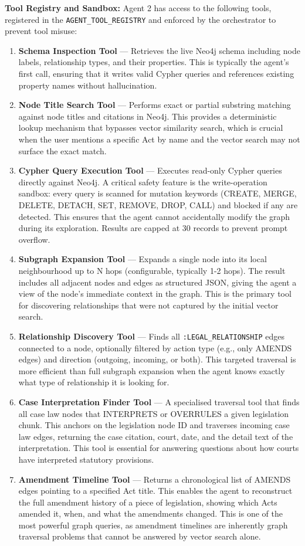 \documentclass[10pt, a4paper, twocolumn]{article}
\begin{document}
\textbf{Tool Registry and Sandbox:} Agent 2 has access to the following tools, registered in the \texttt{AGENT\_TOOL\_REGISTRY} and enforced by the orchestrator to prevent tool misuse:

\begin{enumerate}
    \item \textbf{Schema Inspection Tool} — Retrieves the live Neo4j schema including node labels, relationship types, and their properties. This is typically the agent's first call, ensuring that it writes valid Cypher queries and references existing property names without hallucination.
    \item \textbf{Node Title Search Tool} — Performs exact or partial substring matching against node titles and citations in Neo4j. This provides a deterministic lookup mechanism that bypasses vector similarity search, which is crucial when the user mentions a specific Act by name and the vector search may not surface the exact match.
    \item \textbf{Cypher Query Execution Tool} — Executes read-only Cypher queries directly against Neo4j. A critical safety feature is the write-operation sandbox: every query is scanned for mutation keywords (CREATE, MERGE, DELETE, DETACH, SET, REMOVE, DROP, CALL) and blocked if any are detected. This ensures that the agent cannot accidentally modify the graph during its exploration. Results are capped at 30 records to prevent prompt overflow.
    \item \textbf{Subgraph Expansion Tool} — Expands a single node into its local neighbourhood up to N hops (configurable, typically 1-2 hops). The result includes all adjacent nodes and edges as structured JSON, giving the agent a view of the node's immediate context in the graph. This is the primary tool for discovering relationships that were not captured by the initial vector search.
    \item \textbf{Relationship Discovery Tool} — Finds all \texttt{:LEGAL\_RELATIONSHIP} edges connected to a node, optionally filtered by action type (e.g., only AMENDS edges) and direction (outgoing, incoming, or both). This targeted traversal is more efficient than full subgraph expansion when the agent knows exactly what type of relationship it is looking for.
    \item \textbf{Case Interpretation Finder Tool} — A specialised traversal tool that finds all case law nodes that INTERPRETS or OVERRULES a given legislation chunk. This anchors on the legislation node ID and traverses incoming case law edges, returning the case citation, court, date, and the detail text of the interpretation. This tool is essential for answering questions about how courts have interpreted statutory provisions.
    \item \textbf{Amendment Timeline Tool} — Returns a chronological list of AMENDS edges pointing to a specified Act title. This enables the agent to reconstruct the full amendment history of a piece of legislation, showing which Acts amended it, when, and what the amendments changed. This is one of the most powerful graph queries, as amendment timelines are inherently graph traversal problems that cannot be answered by vector search alone.
\end{enumerate}
\end{document}
